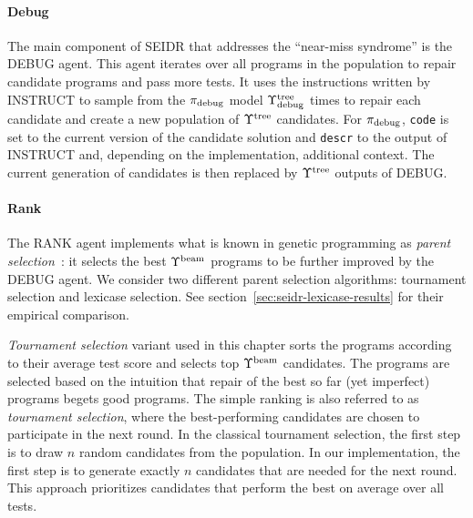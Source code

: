 \paragraph{Debug}

The main component of SEIDR that addresses the ``near-miss syndrome'' is the DEBUG agent.  
This agent iterates over all programs in the population to repair candidate programs and pass more tests. 
It uses the instructions written by INSTRUCT to sample from the $ \pi_\text{debug} $ model $\Upsilon^\text{tree}_\text{debug}$ times
to repair each candidate and create a new population of $\Upsilon^\text{tree}{}$ candidates.
For $ \pi_\text{debug} $, \texttt{code} is set to the current version of the candidate solution and \texttt{descr} to the output of INSTRUCT and, depending on the implementation, additional context.
The current generation of candidates is then replaced by $\Upsilon^\text{tree}{}$ outputs of DEBUG.

\paragraph{Rank}

The RANK agent implements what is known in genetic programming as \emph{parent selection}~\cite{koza1994:genetic}: it selects the best $\Upsilon^\text{beam}{}$ programs to be further improved by the DEBUG agent.
We consider two different parent selection algorithms: tournament selection and lexicase selection. 
See section~\ref{sec:seidr-lexicase-results} for their empirical comparison.

\emph{Tournament selection} variant used in this chapter sorts the programs according to their average test score and selects top $\Upsilon^\text{beam}{}$ candidates. 
The programs are selected based on the intuition that repair of the best so far (yet imperfect) programs begets good programs. 
The simple ranking is also referred to as \emph{tournament selection}, where the best-performing candidates are chosen to participate in the next round.  
In the classical tournament selection, the first step is to draw $n$ random candidates from the population. 
In our implementation, the first step is to generate exactly $n$ candidates that are needed for the next round. 
This approach prioritizes candidates that perform the best on average over all tests.

